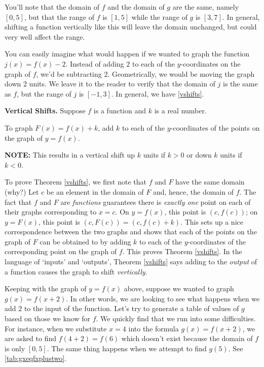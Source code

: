You'll note that the domain of $f$ and the domain of $g$ are the same, namely $[0,5]$, but that the range of $f$ is $[1,5]$ while the range of $g$ is $[3,7]$.  In general, shifting a function vertically like this will leave the domain unchanged, but could very well affect the range.  

You can easily imagine what would happen if we wanted to graph the function $j(x) = f(x) - 2$.  Instead of adding $2$ to each of the $y$-coordinates on the graph of $f$, we'd be subtracting $2$.  Geometrically, we would be moving the graph down $2$ units.  We leave it to the reader to verify that the domain of $j$ is the same as $f$, but the range of $j$ is $[-1,3]$.  In general, we have \autoref{vshifts}.

\begin{mthm} \label{vshifts} \textbf{Vertical Shifts.} Suppose $f$ is a function and $k$ is a real number. 

To graph $F(x) = f(x) + k$,  add $k$ to each of the $y$-coordinates of the points on the graph of $y=f(x)$.

\textbf{NOTE:}  This results in a vertical shift up $k$ units if $k > 0$ or down $k$ units if $k< 0$.

\end{mthm}

To prove Theorem \ref{vshifts}, we first note that $f$ and $F$ have the same domain (why?)  Let $c$ be an element in the domain of $F$ and, hence, the domain of $f$.  The fact that $f$ and $F$ are \textit{functions} guarantees  there is \textit{exactly one} point on each of their  graphs corresponding to $x=c$.  On $y=f(x)$, this point is $(c, f(c))$;  on $y = F(x)$, this point is  $(c, F(c)) = (c, f(c)+k)$.  This sets up a nice correspondence between the two graphs and shows that each of the points on the graph of $F$ can be obtained to by adding $k$ to each of the $y$-coordinates of the corresponding point on the graph  of $f$.  This  proves  Theorem \ref{vshifts}.   In the language of `inputs' and `outputs', Theorem \ref{vshifts} says adding to the \textit{output} of a function causes the graph to shift \textit{vertically}. 
 
Keeping with the graph of $y=f(x)$ above, suppose we wanted to graph $g(x) = f(x+2)$.  In other words, we are looking to see what happens when we add $2$ to the input of the function. Let's try to generate a table of values of $g$ based on those we know for $f$.  We quickly find that we run into some difficulties. For instance, when we substitute $x=4$ into the formula $g(x)=f(x+2)$, we are asked to find $f(4+2)=f(6)$ which doesn't exist because the domain of $f$ is only $[0,5]$.  The same thing happens when we attempt to find $g(5)$. See \autoref{tab:gxeqfxplustwo}.

